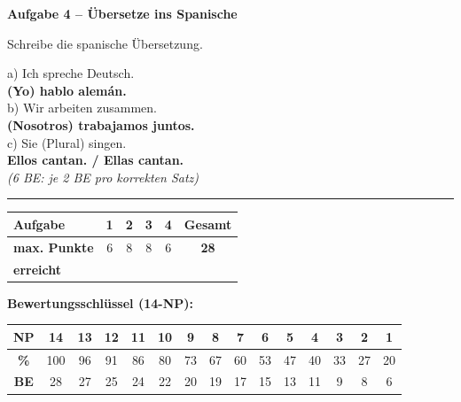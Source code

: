 \documentclass[11pt, a4paper]{article}
\newcommand{\fachfarbe}{spanisch}
\newcommand{\punktebox}[1]{\hfill\fbox{\small \_\_\_/#1}}
\newcommand{\lsg}[1]{\textcolor{loesung}{\textbf{#1}}}
\newenvironment{aufgabe}[1]{%
    \vspace{12pt}
    \noindent\textbf{\textcolor{\fachfarbe}{Aufgabe #1}}
    \vspace{6pt}
    \begin{list}{}{\leftmargin=0pt}
    \item[]
}{%
    \end{list}
}
\begin{document}
\vspace{15pt}


\begin{aufgabe}{4 -- Übersetze ins Spanische}
Schreibe die spanische Übersetzung. \punktebox{6}
\end{aufgabe}

\noindent
a) Ich spreche Deutsch. \\[0.5em]
\lsg{(Yo) hablo alemán.} \\[1em]

\noindent
b) Wir arbeiten zusammen. \\[0.5em]
\lsg{(Nosotros) trabajamos juntos.} \\[1em]

\noindent
c) Sie (Plural) singen. \\[0.5em]
\lsg{Ellos cantan. / Ellas cantan.} \\

\textcolor{loesung}{\textit{(6 BE: je 2 BE pro korrekten Satz)}}


\vspace{20pt}
\hrule
\vspace{10pt}

\noindent
\begin{tabularx}{\textwidth}{|X|c|c|c|c||c|}
\hline
\textbf{Aufgabe} & 1 & 2 & 3 & 4 & \textbf{Gesamt} \\
\hline
\textbf{max. Punkte} & 6 & 8 & 8 & 6 & \textbf{28} \\
\hline
\textbf{erreicht} & & & & & \\[0.8em]
\hline
\end{tabularx}

\vspace{15pt}

\noindent\textbf{Bewertungsschlüssel (14-NP):}

\begin{center}
\begin{tabular}{|c|c|c|c|c|c|c|c|c|c|c|c|c|c|c|}
\hline
\textbf{NP} & 14 & 13 & 12 & 11 & 10 & 9 & 8 & 7 & 6 & 5 & 4 & 3 & 2 & 1 \\
\hline
\textbf{\%} & 100 & 96 & 91 & 86 & 80 & 73 & 67 & 60 & 53 & 47 & 40 & 33 & 27 & 20 \\
\hline
\textbf{BE} & 28 & 27 & 25 & 24 & 22 & 20 & 19 & 17 & 15 & 13 & 11 & 9 & 8 & 6 \\
\hline
\end{tabular}
\end{center}
\end{document}
